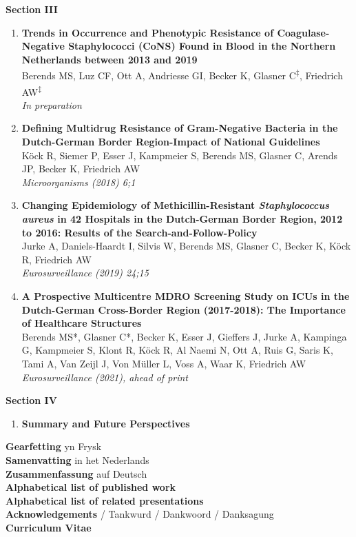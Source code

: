 \documentclass[
]{book}
\providecommand{\tightlist}{%
  \setlength{\itemsep}{0pt}\setlength{\parskip}{0pt}}
\begin{document}
\textbf{Section III}

\begin{enumerate}
\def\labelenumi{\arabic{enumi}.}
\setcounter{enumi}{6}
\item
  \textbf{Trends in Occurrence and Phenotypic Resistance of Coagulase-Negative Staphylococci (CoNS) Found in Blood in the Northern Netherlands between 2013 and 2019}\\
  Berends MS, Luz CF, Ott A, Andriesse GI, Becker K, Glasner C\textsuperscript{‡}, Friedrich AW\textsuperscript{‡}\\
  \emph{In preparation}
\item
  \textbf{Defining Multidrug Resistance of Gram-Negative Bacteria in the Dutch-German Border Region-Impact of National Guidelines}\\
  Köck R, Siemer P, Esser J, Kampmeier S, Berends MS, Glasner C, Arends JP, Becker K, Friedrich AW\\
  \emph{Microorganisms (2018) 6;1}
\item
  \textbf{Changing Epidemiology of Methicillin-Resistant \emph{Staphylococcus aureus} in 42 Hospitals in the Dutch-German Border Region, 2012 to 2016: Results of the Search-and-Follow-Policy}\\
  Jurke A, Daniels-Haardt I, Silvis W, Berends MS, Glasner C, Becker K, Köck R, Friedrich AW\\
  \emph{Eurosurveillance (2019) 24;15}
\item
  \textbf{A Prospective Multicentre MDRO Screening Study on ICUs in the Dutch-German Cross-Border Region (2017-2018): The Importance of Healthcare Structures}\\
  Berends MS*, Glasner C*, Becker K, Esser J, Gieffers J, Jurke A, Kampinga G, Kampmeier S, Klont R, Köck R, Al Naemi N, Ott A, Ruis G, Saris K, Tami A, Van Zeijl J, Von Müller L, Voss A, Waar K, Friedrich AW\\
  \emph{Eurosurveillance (2021), ahead of print}
\end{enumerate}

\textbf{Section IV}

\begin{enumerate}
\def\labelenumi{\arabic{enumi}.}
\setcounter{enumi}{10}
\tightlist
\item
  \textbf{Summary and Future Perspectives}
\end{enumerate}

\textbf{Gearfetting} yn Frysk\\
\textbf{Samenvatting} in het Nederlands\\
\textbf{Zusammenfassung} auf Deutsch\\
\textbf{Alphabetical list of published work}\\
\textbf{Alphabetical list of related presentations}\\
\textbf{Acknowledgements} / Tankwurd / Dankwoord / Danksagung\\
\textbf{Curriculum Vitae}
\end{document}
